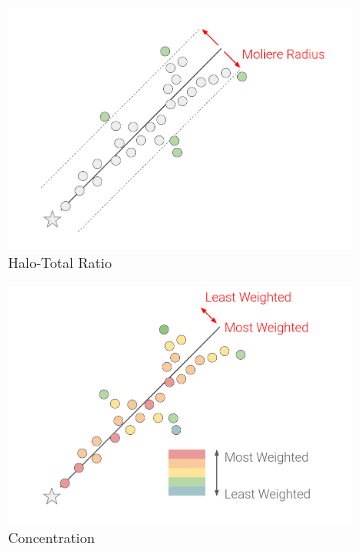 \begin{figure}[hb!]
        \centering
        \begin{subfigure}[b]{0.495\textwidth}
            \centering
            \includegraphics[width=\textwidth]{HaloTotalRatio}
            \caption{Halo-Total Ratio}%
            \label{fig:halototalratio}
        \end{subfigure}
        \hfill
        \begin{subfigure}[b]{0.495\textwidth}  
            \centering 
            \includegraphics[width=\textwidth]{Concentration}
            \caption{Concentration}%
            \label{fig:concentration}
        \end{subfigure}
        \hfill
        \begin{subfigure}[b]{0.495\textwidth}  
            \centering 

\end{subfigure}
\end{figure}
